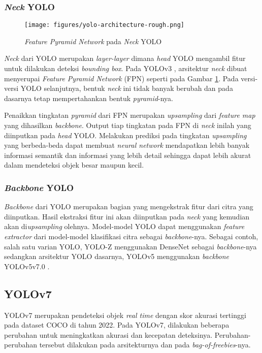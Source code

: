     \subsubsection{\emph{Neck} YOLO}
  
      \begin{figure}[H]
          \centering
          \texttt{[image: figures/yolo-architecture-rough.png]}
          \caption{\emph{Feature Pyramid Network} pada \emph{Neck} YOLO}
          \label{fig:yolofpn}
      \end{figure}
  
      \emph{Neck} dari YOLO merupakan \emph{layer-layer} dimana \emph{head} YOLO mengambil fitur untuk dilakukan deteksi \emph{bounding box}.
      Pada YOLOv3 \textcite{yolov3}, arsitektur \emph{neck} dibuat menyerupai \emph{Feature Pyramid Network} (FPN) seperti pada Gambar \ref{fig:yolofpn}. 
      Pada versi-versi YOLO selanjutnya, bentuk \emph{neck} ini tidak banyak berubah dan pada dasarnya tetap mempertahankan bentuk \emph{pyramid}-nya.
  
      Penaikkan tingkatan \emph{pyramid} dari FPN merupakan \emph{upsampling} dari \emph{feature map} yang dihasilkan \emph{backbone}.
      Output tiap tingkatan pada FPN di \emph{neck} inilah yang diinputkan pada \emph{head} YOLO. 
      Melakukan prediksi pada tingkatan \emph{upsampling} yang berbeda-beda dapat membuat \emph{neural network} mendapatkan lebih banyak informasi semantik dan informasi yang lebih detail sehingga dapat lebih akurat dalam mendeteksi objek besar maupun kecil.
  
    \subsubsection{\emph{Backbone} YOLO}
      \emph{Backbone} dari YOLO merupakan bagian yang mengekstrak fitur dari citra yang diinputkan.
      Hasil ekstraksi fitur ini akan diinputkan pada \emph{neck} yang kemudian akan di\emph{upsampling} olehnya.
      Model-model YOLO dapat menggunakan \emph{feature extractor} dari model-model klasifikasi citra sebagai \emph{backbone}-nya.
      Sebagai contoh, salah satu varian YOLO, YOLO-Z menggunakan DenseNet sebagai \emph{backbone}-nya sedangkan arsitektur YOLO dasarnya, YOLOv5 menggunakan \emph{backbone} YOLOv5v7.0 \parencite{yoloz}.
  
  
  
  
  \subsection{YOLOv7}
    YOLOv7 merupakan pendeteksi objek \emph{real time} dengan skor akurasi tertinggi pada dataset COCO di tahun 2022.
    Pada YOLOv7, dilakukan beberapa perubahan untuk meningkatkan akurasi dan kecepatan deteksinya.
    Perubahan-perubahan tersebut dilakukan pada arsitekturnya dan pada \emph{bag-of-freebies}-nya.
  
